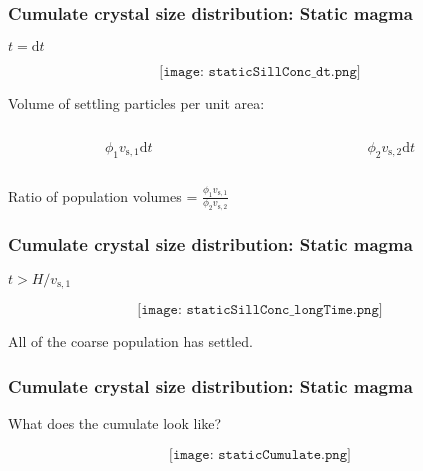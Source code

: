 \documentclass{beamer}
\begin{document}
\begin{frame}
  \frametitle{Cumulate crystal size distribution: Static magma}

  \centering $t = \mathrm{d} t$
  
  $$\texttt{[image: staticSillConc\_dt.png]}$$

  Volume of settling particles per unit area:

  \vspace{-0.5cm}
  
  \begin{columns}[t]

    \begin{column}{0.5\paperwidth}

      $$ \phi_{1} v_{\text{s}, 1} \mathrm{d}t $$

    \end{column}
    
    \begin{column}{0.5\paperwidth}

      $$ \phi_{2} v_{\text{s}, 2} \mathrm{d}t $$

    \end{column}
    
  \end{columns}

  \vspace{0.5cm}
  
  Ratio of population volumes = $\frac{\phi_{1} v_{\text{s}, 1}}{\phi_{2} v_{\text{s}, 2}}$ 
\end{frame}
\begin{frame}
  \frametitle{Cumulate crystal size distribution: Static magma}

  \centering $t > H / v_{\text{s}, 1}$
  
  $$\texttt{[image: staticSillConc\_longTime.png]}$$

  All of the coarse population has settled.  
\end{frame}
\begin{frame}
  \frametitle{Cumulate crystal size distribution: Static magma}

  What does the cumulate look like?
  
  $$\texttt{[image: staticCumulate.png]}$$

\end{frame}
\end{document}
